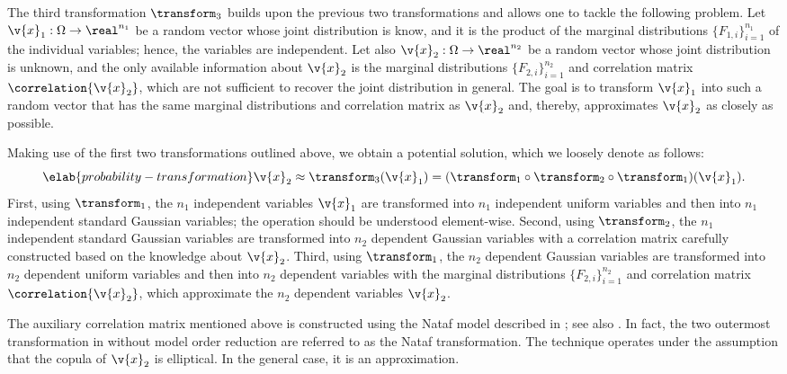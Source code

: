The third transformation $\transform_3$ builds upon the previous two
transformations and allows one to tackle the following problem. Let $\v{x}_1:
\Omega \to \real^{n_1}$ be a random vector whose joint distribution is know, and
it is the product of the marginal distributions $\{ F_{1, i} \}_{i = 1}^{n_1}$
of the individual variables; hence, the variables are independent. Let also
$\v{x}_2: \Omega \to \real^{n_2}$ be a random vector whose joint distribution is
unknown, and the only available information about $\v{x}_2$ is the marginal
distributions $\{ F_{2, i} \}_{i = 1}^{n_2}$ and correlation matrix
$\correlation{\v{x}_2}$, which are not sufficient to recover the joint
distribution in general. The goal is to transform $\v{x}_1$ into such a random
vector that has the same marginal distributions and correlation matrix as
$\v{x}_2$ and, thereby, approximates $\v{x}_2$ as closely as possible.

Making use of the first two transformations outlined above, we obtain a
potential solution, which we loosely denote as follows:
\begin{equation} \elab{probability-transformation}
  \v{x}_2 \approx \transform_3(\v{x}_1) = (\transform_1 \circ \transform_2 \circ \transform_1)(\v{x}_1).
\end{equation}
First, using $\transform_1$, the $n_1$ independent variables $\v{x}_1$ are
transformed into $n_1$ independent uniform variables and then into $n_1$
independent standard Gaussian variables; the operation should be understood
element-wise. Second, using $\transform_2$, the $n_1$ independent standard
Gaussian variables are transformed into $n_2$ dependent Gaussian variables with
a correlation matrix carefully constructed based on the knowledge about
$\v{x}_2$. Third, using $\transform_1$, the $n_2$ dependent Gaussian variables
are transformed into $n_2$ dependent uniform variables and then into $n_2$
dependent variables with the marginal distributions $\{ F_{2, i} \}_{i =
1}^{n_2}$ and correlation matrix $\correlation{\v{x}_2}$, which approximate the
$n_2$ dependent variables $\v{x}_2$.

The auxiliary correlation matrix mentioned above is constructed using the Nataf
model described in \cite{liu1986}; see also \cite{li2008}. In fact, the two
outermost transformation in  without model
order reduction are referred to as the Nataf transformation. The technique
operates under the assumption that the copula of $\v{x}_2$ is elliptical. In the
general case, it is an approximation.
